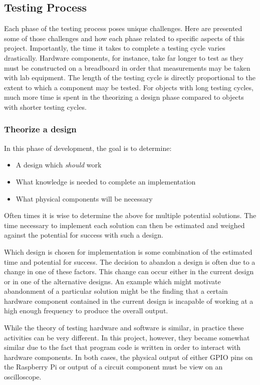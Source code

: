 \documentclass{article}	%
\begin{document}
\begin{multicols}{2}
\subsection{Testing Process}
Each phase of the testing process poses unique challenges.
Here are presented some of those challenges and
how each phase related to specific aspects of this project.
Importantly, the time it takes to complete a 
testing cycle varies drastically.
Hardware components, for instance, take far longer to test
as they must be constructed on a breadboard in order that 
measurements may be taken with lab equipment.
%
The length of the testing cycle is 
directly proportional to the extent to
which a component may be tested.
%
For objects with long testing cycles,
much more time is spent in the 
theorizing a design phase compared to
objects with shorter testing cycles.

\subsubsection{Theorize a design}
In this phase of development,
the goal is to determine:
\begin{itemize}
\item A design which \emph{should} work
\item What knowledge is needed to complete an implementation
\item What physical components will be necessary
\end{itemize}

Often times it is wise to determine the above for
multiple potential solutions.
The time necessary to implement each solution
can then be estimated and weighed against
the potential for success with such a design.

Which design is chosen for implementation is
some combination of the estimated time and
potential for success.
The decision to abandon a design is often
due to a change in one of these factors.
This change can occur either
in the current design or
in one of the alternative designs.
An example which might motivate abandonment of a 
particular solution might be
the finding that a certain hardware component
contained in the current design is incapable of 
working at a high enough frequency to
produce the overall output.

While the theory of testing hardware and software is similar,
in practice these activities can be very different.
In this project, however,
they became somewhat similar 
due to the fact that program code is written in order to 
interact with hardware components.
In both cases,
the physical output of either GPIO pins on the Raspberry Pi
or output of a circuit component must be view on
an oscilloscope.


\end{multicols}
\end{document}
